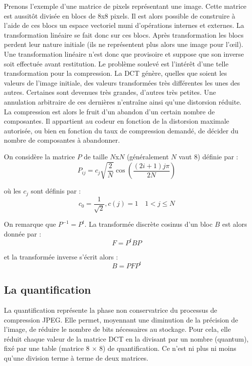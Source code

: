 \documentclass[a4paper,10pt]{article}
\begin{document}
Prenons l'exemple d'une matrice de pixels représentant une image. Cette matrice est aussitôt divisée en blocs de 8x8 pixels. Il est alors possible de construire à l'aide de ces blocs un espace vectoriel muni d'opérations internes et externes. La transformation linéaire se fait donc sur ces blocs. Après transformation les blocs perdent leur nature initiale (ils ne représentent plus alors une image pour l'\oe il). Une transformation linéaire n'est donc que provisoire et suppose que son inverse soit effectuée avant restitution. Le problème soulevé est l'intérêt d'une telle transformation pour la compression. La DCT génère, quelles que soient les valeurs de l'image initiale, des valeurs transformées très différentes les unes des autres. Certaines sont devenues très grandes, d'autres très petites. Une annulation arbitraire de ces dernières n'entraîne ainsi qu'une distorsion réduite. La compression est alors le fruit d'un abandon d'un certain nombre de composantes. Il appartient au codeur en fonction de la distorsion maximale autorisée, ou bien en fonction du taux de compression demandé, de décider du nombre de composantes à abandonner.

On considère la matrice $P$ de taille $N$x$N$ (généralement $N$ vaut 8) définie par :
\begin{equation}
P_{ij} = c_j \sqrt{\frac{2}{N}} \cos{\left( \frac{(2i+1)j\pi}{2N}\right)}
\end{equation}

où les $c_j$ sont définis par : 
\begin{equation}
	c_0 = \frac{1}{\sqrt{2}}, c(j)=1 \quad 1 < j \leq N
\end{equation}

On remarque que $P^{-1} = P^{t}$. La transformée discrète cosinus d'un bloc $B$ est alors donnée par :
\begin{equation}
	F = P^{t} B P
\end{equation}

et la transformée inverse s'écrit alors : 
\begin{equation}
	B = P F P^{t} 
\end{equation}

\subsection{La quantification}

 La quantification représente la phase non conservatrice du processus de compression JPEG. Elle permet, moyennant une diminution de la précision de l'image, de réduire le nombre de bits nécessaires au stockage. Pour cela, elle réduit chaque valeur de la matrice DCT en la divisant par un nombre (quantum), fixé par une table (matrice 8 $\times$ 8) de quantification. Ce n'est ni plus ni moins qu'une division terme à terme de deux matrices.
 
\end{document}
